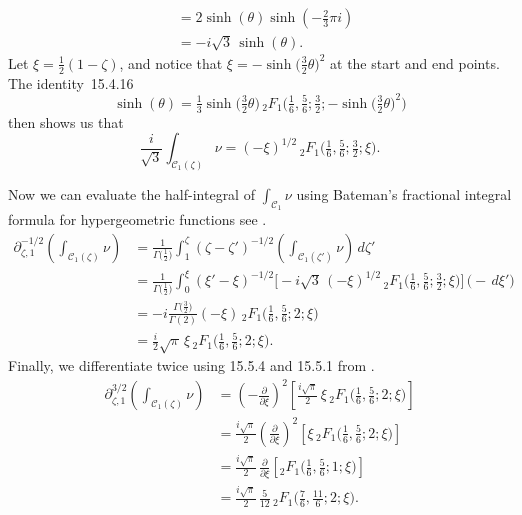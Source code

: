 \documentclass{article}
\newcommand{\fracderiv}[3]{\partial^{#1}_{#2, #3}}
\theoremstyle{definition}
\theoremstyle{plain}
\newenvironment{old}{\color{RoyalBlue}}{\color{black}}
\begin{document}
\begin{old}
\begin{align*}
& = 2\sinh(\theta) \sinh(-\tfrac{2}{3}\pi i) \\
& = -i\sqrt{3}\,\sinh(\theta).
\end{align*}
Let $\xi = \tfrac{1}{2}(1 - \zeta)$, and notice that $\xi = -\sinh\big(\tfrac{3}{2} \theta\big)^2$ at the start and end points. The identity~15.4.16 \cite{dlmf}
\[ \sinh( \theta) = \tfrac{1}{3} \sinh\big( \tfrac{3}{2}\theta\big)\,{}_2F_1\big(\tfrac{1}{6}, \tfrac{5}{6}; \tfrac{3}{2}; -\sinh\big(\tfrac{3}{2}\theta\big)^2\big) \]
then shows us that
\[ \frac{i}{\sqrt{3}} \int_{\mathcal{C}_1(\zeta)} \nu = (-\xi)^{1/2}\,{}_2F_1\big(\tfrac{1}{6}, \tfrac{5}{6}; \tfrac{3}{2}; \xi\big). \]

Now we can evaluate the half-integral of $\int_{\mathcal{C}_1} \nu$ using Bateman's fractional integral formula for hypergeometric functions see \cite[Section 4.1]{koornwinder2015fractional}.
\begin{align*}
\fracderiv{-1/2}{\zeta}{1} \left( \int_{\mathcal{C}_1(\zeta)} \nu \right) & = \frac{1}{\Gamma\big(\tfrac{1}{2}\big)} \int_{1}^\zeta (\zeta - \zeta')^{-1/2} \left( \int_{\mathcal{C}_1(\zeta')} \nu \right)\,d\zeta' \\
& = \frac{1}{\Gamma\big(\tfrac{1}{2}\big)} \int_0^\xi  (\xi' - \xi)^{-1/2} \Big[ -{i}{\sqrt{3}}\, (-\xi)^{1/2}\,{}_2F_1\big(\tfrac{1}{6}, \tfrac{5}{6}; \tfrac{3}{2}; \xi\big) \Big] \,\big( -\,d\xi' \big) \\
& = -i \frac{\Gamma\big(\tfrac{3}{2}\big)}{\Gamma(2)} (-\xi)\,{}_2F_1\big(\tfrac{1}{6}, \tfrac{5}{6}; 2; \xi\big) \\
& = \frac{i}{2} \sqrt{\pi}\,\xi\, {}_2F_1\big(\tfrac{1}{6}, \tfrac{5}{6}; 2; \xi\big).
\end{align*}
Finally, we differentiate twice using 15.5.4 and 15.5.1 from \cite{dlmf}.
\begin{align*}
\fracderiv{3/2}{\zeta}{1} \left( \int_{\mathcal{C}_1(\zeta)} \nu \right) & = \left(-\tfrac{\partial}{\partial \xi}\right)^2 \left[ \frac{i\sqrt{\pi}}{2}\,\xi\, {}_2F_1\big(\tfrac{1}{6}, \tfrac{5}{6}; 2; \xi\big) \right] \\
& =  \tfrac{i\sqrt{\pi}}{2} \left(\tfrac{\partial}{\partial \xi}\right)^2 \left[ \xi\,{}_2F_1\big(\tfrac{1}{6}, \tfrac{5}{6}; 2; \xi\big) \right] \\
& = \tfrac{i\sqrt{\pi}}{2}\,\tfrac{\partial}{\partial \xi} \left[ {}_2F_1\big(\tfrac{1}{6}, \tfrac{5}{6}; 1; \xi\big) \right] \\
& = \tfrac{i\sqrt{\pi}}{2}\,\tfrac{5}{12}\, {}_2F_1\big(\tfrac{7}{6}, \tfrac{11}{6}; 2; \xi\big).
\end{align*}

\end{old}
\end{document}
